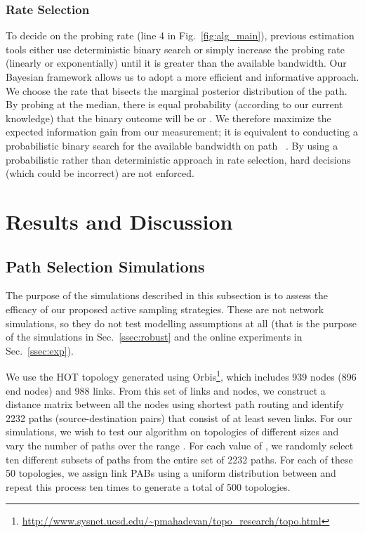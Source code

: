 \documentclass[final,5p,times,twocolumn]{elsarticle}
\begin{document}
\subsubsection{Rate Selection}
	
To decide on the probing rate (line 4 in Fig.~\ref{fig:alg_main}), previous estimation tools either use deterministic binary search or simply increase the probing rate (linearly or exponentially) until it is greater than the available bandwidth.  
Our Bayesian framework allows us to adopt a more efficient and informative approach.   We choose the rate that bisects the marginal posterior distribution of the path.
By probing at the median, there is equal probability (according to our current knowledge) that the binary outcome will be  or .  
We therefore maximize the expected information gain from our measurement; it is equivalent to conducting a probabilistic binary search for the available bandwidth on path ~\cite{cas:07}.  
By using a probabilistic rather than deterministic approach in rate selection, hard decisions (which could be incorrect) are not enforced.


\section{Results and Discussion}
\label{sec:res}

\subsection{Path Selection Simulations}
\label{ssec:sim}

The purpose of the simulations described in this subsection is to assess the efficacy of our proposed active sampling strategies. These are not network simulations, so they do not test modelling assumptions at all (that is the purpose of the simulations in Sec.~\ref{ssec:robust} and the online experiments in Sec.~\ref{ssec:exp}).  

We use the HOT topology generated using Orbis\footnote{\url{http://www.sysnet.ucsd.edu/~pmahadevan/topo_research/topo.html}}, which includes 939 nodes (896 end nodes) and 988 links.  From this set of links and nodes, we construct a distance matrix between all the nodes using shortest path routing and identify 2232 paths (source-destination pairs) that consist of at least seven links.  For our simulations, we wish to test our algorithm on topologies of different sizes and vary the number of paths over the range .  For each value of , we randomly select ten different subsets of  paths from the entire set of 2232 paths.  For each of these 50 topologies, we assign link PABs using a uniform distribution between  and repeat this process ten times to generate a total of 500 topologies.
\end{document}
